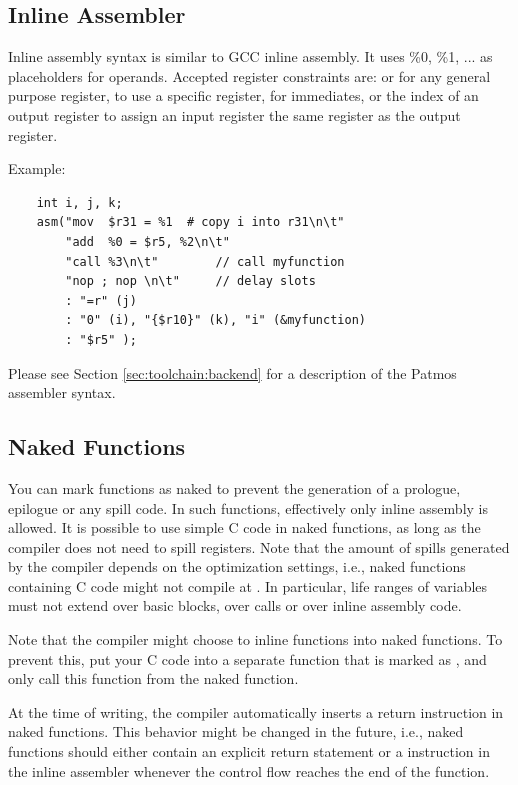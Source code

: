 \subsection{Inline Assembler}

Inline assembly syntax is similar to GCC inline assembly. It uses \%0, \%1, ... as placeholders for
operands. Accepted register constraints are:  or  for any general purpose register,
 to use a specific register,  for immediates, or the index of an output register to
assign an input register the same register as the output register.

Example:
\begin{verbatim}
    int i, j, k;
    asm("mov  $r31 = %1  # copy i into r31\n\t"
        "add  %0 = $r5, %2\n\t"
        "call %3\n\t"        // call myfunction
        "nop ; nop \n\t"     // delay slots
        : "=r" (j)
        : "0" (i), "{$r10}" (k), "i" (&myfunction)
        : "$r5" );
\end{verbatim}

Please see Section \ref{sec:toolchain:backend} for a description of the Patmos assembler syntax.

\subsection{Naked Functions}

You can mark functions as naked to prevent the generation of a prologue, epilogue or any spill code.
In such functions, effectively only inline assembly is allowed. It is possible to use simple C code in naked 
functions, as long as the compiler does not need to spill registers. Note that the amount of spills generated by
the compiler depends on the optimization settings, i.e., naked functions containing C code might not compile at
. In particular, life ranges of variables must not extend over basic blocks, over calls or over
inline assembly code.

Note that the compiler might choose to inline functions into naked functions. To prevent this, put your C code into a
separate function that is marked as , and only call this function from the naked function.

At the time of writing, the compiler automatically inserts a return instruction in naked functions. This behavior might be changed
in the future, i.e., naked functions should either contain an explicit return statement or a  instruction in
the inline assembler whenever the control flow reaches the end of the function.

